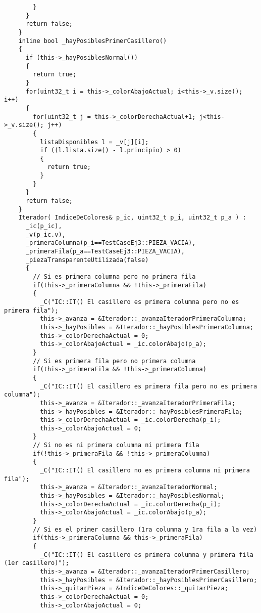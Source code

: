 \documentclass[11pt, a4paper, twoside]{article}
\begin{document}
\begin{lstlisting}
        }
      }
      return false;
    }
    inline bool _hayPosiblesPrimerCasillero() 
    {
      if (this->_hayPosiblesNormal())
      {
        return true;
      }
      for(uint32_t i = this->_colorAbajoActual; i<this->_v.size(); i++)
      {
        for(uint32_t j = this->_colorDerechaActual+1; j<this->_v.size(); j++)
        {
          listaDisponibles l = _v[j][i];
          if ((l.lista.size() - l.principio) > 0)
          {
            return true;
          }
        }
      }
      return false;
    }
    Iterador( IndiceDeColores& p_ic, uint32_t p_i, uint32_t p_a ) : 
      _ic(p_ic),
      _v(p_ic.v),
      _primeraColumna(p_i==TestCaseEj3::PIEZA_VACIA),
      _primeraFila(p_a==TestCaseEj3::PIEZA_VACIA),
      _piezaTransparenteUtilizada(false)
      {
        // Si es primera columna pero no primera fila
        if(this->_primeraColumna && !this->_primeraFila)
        {
          _C("IC::IT() El casillero es primera columna pero no es primera fila");
          this->_avanza = &Iterador::_avanzaIteradorPrimeraColumna;
          this->_hayPosibles = &Iterador::_hayPosiblesPrimeraColumna;
          this->_colorDerechaActual = 0;
          this->_colorAbajoActual = _ic.colorAbajo(p_a);
        }
        // Si es primera fila pero no primera columna
        if(this->_primeraFila && !this->_primeraColumna)
        {
          _C("IC::IT() El casillero es primera fila pero no es primera columna");
          this->_avanza = &Iterador::_avanzaIteradorPrimeraFila;
          this->_hayPosibles = &Iterador::_hayPosiblesPrimeraFila;
          this->_colorDerechaActual = _ic.colorDerecha(p_i); 
          this->_colorAbajoActual = 0;
        }
        // Si no es ni primera columna ni primera fila
        if(!this->_primeraFila && !this->_primeraColumna)
        {
          _C("IC::IT() El casillero no es primera columna ni primera fila");
          this->_avanza = &Iterador::_avanzaIteradorNormal;
          this->_hayPosibles = &Iterador::_hayPosiblesNormal;
          this->_colorDerechaActual = _ic.colorDerecha(p_i); 
          this->_colorAbajoActual = _ic.colorAbajo(p_a);
        }
        // Si es el primer casillero (1ra columna y 1ra fila a la vez)
        if(this->_primeraColumna && this->_primeraFila)
        {
          _C("IC::IT() El casillero es primera columna y primera fila (1er casillero)");
          this->_avanza = &Iterador::_avanzaIteradorPrimerCasillero;
          this->_hayPosibles = &Iterador::_hayPosiblesPrimerCasillero;
          this->_quitarPieza = &IndiceDeColores::_quitarPieza;
          this->_colorDerechaActual = 0; 
          this->_colorAbajoActual = 0;

\end{lstlisting}
\end{document}
